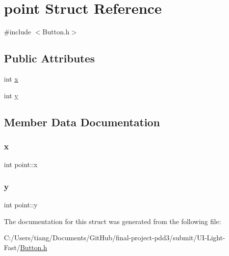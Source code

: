 \hypertarget{structpoint}{}\section{point Struct Reference}
\label{structpoint}


{\ttfamily \#include $<$Button.\+h$>$}

\subsection*{Public Attributes}
\begin{DoxyCompactItemize}
\item 
int \mbox{\hyperlink{structpoint_ad679b07fb69d55f5ad454d0f1f2891d5}{x}}
\item 
int \mbox{\hyperlink{structpoint_a9a82ca9504acabb1e30569f89c805471}{y}}
\end{DoxyCompactItemize}


\subsection{Member Data Documentation}
\mbox{\label{structpoint_ad679b07fb69d55f5ad454d0f1f2891d5}} 
\subsubsection{\texorpdfstring{x}{x}}
{\footnotesize\ttfamily int point\+::x}

\mbox{\label{structpoint_a9a82ca9504acabb1e30569f89c805471}} 
\subsubsection{\texorpdfstring{y}{y}}
{\footnotesize\ttfamily int point\+::y}



The documentation for this struct was generated from the following file\+:\begin{DoxyCompactItemize}
\item 
C\+:/\+Users/tiang/\+Documents/\+Git\+Hub/final-\/project-\/pdd3/submit/\+U\+I-\/\+Light-\/\+Fast/\mbox{\hyperlink{_button_8h}{Button.\+h}}\end{DoxyCompactItemize}

